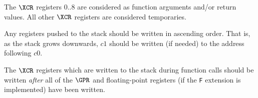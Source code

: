 The $\XCR$ registers $0..8$ are considered as function arguments
and/or return values. 
All other $\XCR$ registers are considered temporaries.

Any registers pushed to the stack should be written in ascending order.
That is, as the stack grows downwards, $c1$ should be written (if needed)
to the address following $c0$.

The $\XCR$ registers which are written to the stack during function calls
should be written {\em after} all of the $\GPR$ and floating-point registers
(if the {\tt F} extension is implemented) have been written.


